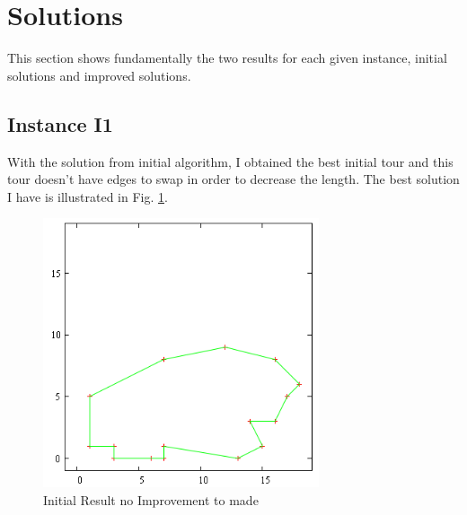 \documentclass[11pt]{article}
\begin{document}
\section{Solutions}
This section shows fundamentally the two results for each given instance, initial solutions and improved solutions.
\subsection{Instance I1}
With the solution from initial algorithm, I obtained the best initial tour and this tour doesn't have edges to swap in order to decrease the length. The best solution I have is illustrated in Fig. \ref{I1}.
\begin{figure}[ht]
\centering
\includegraphics[width=3.2in]{I1}
\caption{Initial Result no Improvement to made}
\label{I1}
\end{figure}
\end{document}

